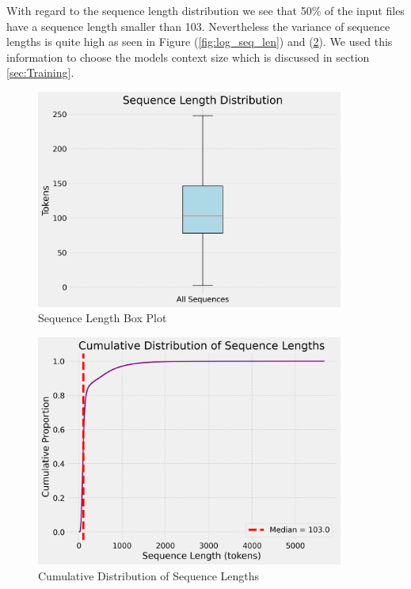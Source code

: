 \documentclass[a4paper,12pt]{extarticle}
\begin{document}
With regard to the sequence length distribution we see that 50\% of the input files have a sequence length smaller than 103.
Nevertheless the variance of sequence lengths is quite high as seen in Figure (\ref{fig:log_seq_len}) and (\ref{fig:cumulative_seq_len}). We used this information to choose the models context size which is discussed in section \ref{sec:Training}.
\begin{figure}[H]
    \centering
    \includegraphics[width=0.9\textwidth]{seq_len_box_plot.png}
    \caption{Sequence Length Box Plot}
    \label{fig:seq_len_box_plot}
\end{figure}
\begin{figure}[H]
    \centering
    \includegraphics[width=0.9\textwidth]{visualization_4096_REMI_train_manual_tokens_True_random_padding_True_cumulative_length_distribution.png}
    \caption{Cumulative Distribution of Sequence Lengths}
    \label{fig:cumulative_seq_len}
\end{figure}
\end{document}
